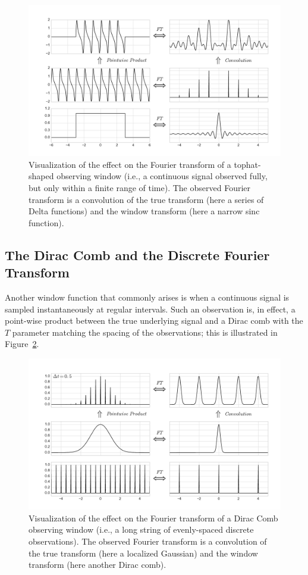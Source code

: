 \documentclass[preprint]{aastex}
\newcommand{\fig}[1]{Figure~\ref{fig:#1}}
\newcommand{\figlabel}[1]{\label{fig:#1}}
\begin{document}
\begin{figure}[ht]
  \centering
  \includegraphics[width=\textwidth]{fig06_Tophat_Window}
  \caption{Visualization of the effect on the Fourier transform of a
    tophat-shaped observing window (i.e., a continuous signal observed
    fully, but only within a finite range of time). The observed Fourier
    transform is a convolution of the true transform (here a series of Delta
    functions) and the window transform (here a narrow sinc function).
    \figlabel{tophat-window}}
\end{figure}

\subsection{The Dirac Comb and the Discrete Fourier Transform}
Another window function that commonly arises is when a continuous signal is
sampled instantaneously at regular intervals.
Such an observation is, in effect, a point-wise product between the true
underlying signal and a Dirac comb with the $T$ parameter matching the spacing
of the observations; this is illustrated in \fig{comb-window-1}.

\begin{figure}[ht]
  \centering
  \includegraphics[width=\textwidth]{fig07_comb_window_1}
  \caption{Visualization of the effect on the Fourier transform of a
    Dirac Comb observing window (i.e., a long string of evenly-spaced
    discrete observations). The observed Fourier
    transform is a convolution of the true transform (here a localized
    Gaussian) and the window transform (here another Dirac comb).
    \figlabel{comb-window-1}}
\end{figure}
\end{document}
